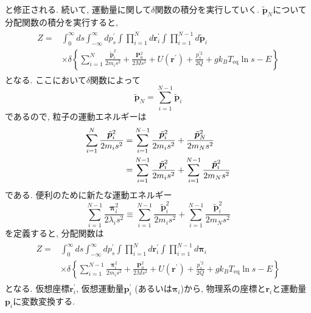 と修正される. 
続いて, 運動量に関して$\delta$関数の積分を実行していく. 
$\tilde{\bm{p}}_{N}$について分配関数の積分を実行すると, 
\begin{align}
  \begin{split}
  Z =&
  \int_{0}^{\infty} ds
  \int_{- \infty}^{\infty} dp^{\prime}_{s}
  \int \prod_{i=1}^{N} d \bm{r}_{i}^{\prime}
  \int \prod_{i=1}^{N-1} d \tilde{\bm{p}}_{i}~\\
  &\times
  \delta
  \left\{
    \sum_{i=1}^{N} \frac{\tilde{\bm{p}}_{i}^{2}}{2m_{i}s^{2}} +
    \frac{\bm{P}_{0}^2}{2Ms^{2}} +
    U(\bm{r}^{\prime}) +
    \frac{p^{\prime 2}_{s}}{2Q} + g k_B T_{\mathrm{eq}} \ln s - E
  \right\}
  \end{split}
\end{align}
となる. ここにおいて$\delta$関数によって
\begin{equation}
  \tilde{\bm{p}}_{N} = \sum_{i=1}^{N-1} \tilde{\bm{p}}_{i}
\end{equation}
であるので, 粒子の運動エネルギーは
\begin{align}
  \sum_{i=1}^{N} \frac{\tilde{\bm{p}}_{i}^{2}}{2m_{i}s^{2}} &=
  \sum_{i=1}^{N-1} \frac{\tilde{\bm{p}}_{i}^{2}}{2m_{i}s^{2}} +
  \frac{\tilde{\bm{p}}_{N}^{2}}{2m_{N}s^{2}}
  \notag \\
  &=
  \sum_{i=1}^{N-1} \frac{\tilde{\bm{p}}_{i}^{2}}{2m_{i}s^{2}} +
  \sum_{i=1}^{N-1} \frac{\tilde{\bm{p}}_{i}^{2}}{2m_{N}s^{2}}
\end{align}
である. 便利のために新たな運動エネルギー
\begin{equation}
  \sum_{i=1}^{N-1} \frac{\bm{\pi}_{i}^{2}}{2\lambda_{i}s^{2}} \equiv
  \sum_{i=1}^{N-1} \frac{\tilde{\bm{p}}_{i}^{2}}{2m_{i}s^{2}} +
  \sum_{i=1}^{N-1} \frac{\tilde{\bm{p}}_{i}^{2}}{2m_{N}s^{2}}
\end{equation}
を定義すると, 分配関数は
\begin{align}
  \begin{split}
  Z =&
  \int_{0}^{\infty} ds
  \int_{- \infty}^{\infty} dp^{\prime}_{s}
  \int \prod_{i=1}^{N} d \bm{r}_{i}^{\prime}
  \int \prod_{i=1}^{N-1} d \bm{\pi}_{i}~\\
  &\times
  \delta
  \left\{
    \sum_{i=1}^{N-1} \frac{\bm{\pi}_{i}^{2}}{2m_{i}s^{2}} +
    \frac{\bm{P}_{0}^2}{2Ms^{2}} +
    U(\bm{r}^{\prime}) +
    \frac{p^{\prime 2}_{s}}{2Q} + g k_B T_{\mathrm{eq}} \ln s - E
  \right\}
  \end{split}
\end{align}
となる. 仮想座標$\bm{r}_{i}^{\prime}$, 仮想運動量$\bm{p}_{i}^{\prime}$ (あるいは$\bm{\pi}_{i}$)から, 物理系の座標と$\bm{r}_{i}$と運動量$\bm{p}_{i}$に変数変換する. 
